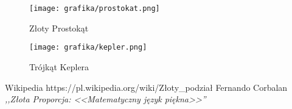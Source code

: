\documentclass{article}
\begin{document}
\newpage
\begin{figure}
\centering
\texttt{[image: grafika/prostokat.png]}
\caption{Złoty Prostokąt}
\label{fig:prostokat}
\centering
\texttt{[image: grafika/kepler.png]}
\caption{Trójkąt Keplera}
\label{fig:kepler}
\end{figure}
\newpage
\begin{thebibliography}{99}
 Wikipedia
https://pl.wikipedia.org/wiki/Złoty\_podział
 Fernando Corbalan
\emph{,,Złota Proporcja: <<Matematyczny język piękna>>''}
\end{thebibliography}
\end{document}
